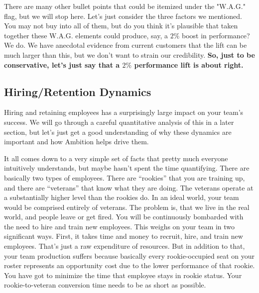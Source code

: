\documentclass[paper=a4, fontsize=11pt abstract]{scrartcl}
\numberwithin{equation}{section}		%
\numberwithin{figure}{section}			%
\numberwithin{table}{section}				%
\begin{document}
There are many other bullet points that could be itemized under the "W.A.G." flag, but we will stop here.  Let's just consider the three factors we mentioned.  You may not buy into all of them, but do you think it's plausible that taken together these W.A.G. elements could produce, say,  a $2\%$ boost in performance?  We do. We have anecdotal evidence from current customers that the lift can be much larger than this, but we don't want to strain our credibility. \textbf{So, just to be conservative, let's just say that a $2\%$ performance lift is about right.}

\subsection{Hiring/Retention Dynamics}
Hiring and retaining employees has a surprisingly large impact on your team's success.  We will go through a careful quantitative analysis of this in a later section, but let's just get a good understanding of why these dynamics are important and how Ambition helps drive them.

It all comes down to a very simple set of facts that pretty much everyone intuitively understands, but maybe hasn't spent the time quantifying.  There are basically two types of employees.  There are ``rookies'' that you are training up, and there are ``veterans'' that know what they are doing.  The veterans operate at a substantially higher level than the rookies do.  In an ideal world, your team would be comprised entirely of veterans.  The problem is, that we live in the real world, and people leave or get fired.  You will be continuously bombarded with the need to hire and train new employees.  This weighs on your team in two significant ways.  First, it takes time and money to recruit, hire, and train new employees.  That's just a raw expenditure of resources.  But in addition to that, your team production suffers because basically every rookie-occupied seat on your roster represents an opportunity cost due to the lower performance of that rookie.  You have got to minimize the time that employee stays in rookie status.  Your rookie-to-veteran conversion time needs to be as short as possible.
\end{document}
